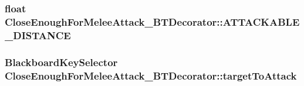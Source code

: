 \subsubsection[{\texorpdfstring{A\+T\+T\+A\+C\+K\+A\+B\+L\+E\+\_\+\+D\+I\+S\+T\+A\+N\+CE}{ATTACKABLE_DISTANCE}}]{\setlength{\rightskip}{0pt plus 5cm}float Close\+Enough\+For\+Melee\+Attack\+\_\+\+B\+T\+Decorator\+::\+A\+T\+T\+A\+C\+K\+A\+B\+L\+E\+\_\+\+D\+I\+S\+T\+A\+N\+CE\hspace{0.3cm}{\ttfamily [private]}}\hypertarget{class_close_enough_for_melee_attack___b_t_decorator_ad97a0c9cac18c905a4ae4cfe59c07815}{}\label{class_close_enough_for_melee_attack___b_t_decorator_ad97a0c9cac18c905a4ae4cfe59c07815}
\subsubsection[{\texorpdfstring{target\+To\+Attack}{targetToAttack}}]{\setlength{\rightskip}{0pt plus 5cm}Blackboard\+Key\+Selector Close\+Enough\+For\+Melee\+Attack\+\_\+\+B\+T\+Decorator\+::target\+To\+Attack}\hypertarget{class_close_enough_for_melee_attack___b_t_decorator_a282f26ed267baec9c049ccebc61f767e}{}\label{class_close_enough_for_melee_attack___b_t_decorator_a282f26ed267baec9c049ccebc61f767e}
